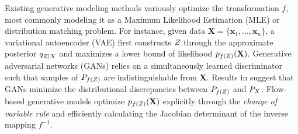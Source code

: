 Existing generative modeling methods variously optimize the transformation $f$, most commonly modeling it as a Maximum Likelihood Estimation (MLE) or distribution matching problem. For instance, given data $\mathbf{X} = \{ \mathbf{x}_{1}, \dots, \mathbf{x}_{n}\}$, a variational autoencoder (VAE) \citep{kingma2013auto} first constructs $\var{Z}$ through the approximate posterior $q_{\var{z}|\var{X}}$ and maximizes a lower bound of likelihood $p_{f(\var{Z})}(\mathbf{X})$. Generative adversarial networks (GANs) \citep{goodfellow2014gan} relies on a simultaneously learned discriminator such that samples of $P_{f(\var{Z})}$ are indistinguishable from $\mathbf{X}$. Results in \citep{arjovsky2017wasserstein, li2017mmdgan} suggest that GANs minimize the distributional discrepancies between $P_{f{(\var{Z})}}$ and $P_{\var{X}}$. Flow-based generative models optimize $p_{f(\var{Z})}(\mathbf{X})$ explicitly through the {\it change of variable rule} and efficiently calculating the Jacobian determinant of the inverse mapping $f^{-1}$. 

